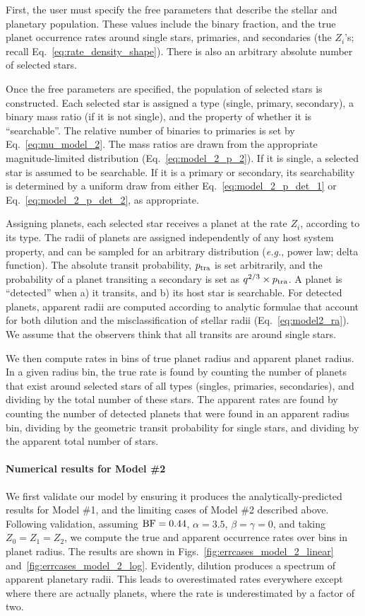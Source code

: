 First, the user must specify the free parameters that describe the 
stellar and planetary population. These values include the binary fraction, 
and the true planet occurrence rates around single stars, primaries, and 
secondaries (the $Z_i$'s; recall Eq.~\ref{eq:rate_density_shape}).
There is also an arbitrary absolute number of selected stars.

Once the free parameters are specified, the population of selected stars is 
constructed.
Each selected star is assigned a type (single, primary, secondary), a 
binary mass ratio (if it is not single), and the property of whether it is 
``searchable''.
The relative number of binaries to primaries is set by 
Eq.~\ref{eq:mu_model_2}.
The mass ratios are drawn from the appropriate magnitude-limited distribution 
(Eq.~\ref{eq:model_2_p_2}).
If it is single, a selected star is assumed to be searchable.
If it is a primary or secondary, its searchability is determined by a uniform 
draw from either Eq.~\ref{eq:model_2_p_det_1} or Eq.~\ref{eq:model_2_p_det_2}, 
as appropriate. 

Assigning planets, each selected star receives a planet at the rate $Z_i$, 
according to its type.
The radii of planets are assigned independently of any host system property, 
and can be sampled for an arbitrary distribution ({\it e.g.}, power law; delta 
function).
The absolute transit probability, $p_{\rm tra}$ is set arbitrarily, and the 
probability of a planet transiting a secondary is set as $q^{2/3}\times p_{\rm 
tra}$.
A planet is ``detected'' when a) it transits, and b) its host star is 
searchable.
For detected planets, apparent radii are computed according to analytic 
formulae that account for both dilution and the misclassification of stellar 
radii (Eq.~\ref{eq:model2_ra}).
We assume that the observers think that all transits are around single stars.

We then compute rates in bins of true planet radius and apparent planet radius.
In a given radius bin, the true rate is found by counting the number of planets
that exist around selected stars of all types (singles, primaries,
secondaries), and dividing by the total number of these stars.
The apparent rates are found by counting the number of detected planets that
were found in an apparent radius bin, dividing by the geometric transit
probability for single stars, and dividing by the apparent total number of
stars.


\paragraph{Numerical results for Model \#2}
We first validate our model by ensuring it produces the analytically-predicted 
results for Model \#1, and the limiting cases of Model \#2 described above.
Following validation, assuming ${\rm BF}=0.44$, $\alpha=3.5$, 
$\beta=\gamma=0$, and taking $Z_0=Z_1=Z_2$, we compute the true and apparent 
occurrence rates over bins in planet radius.
The results are shown in Figs.~\ref{fig:errcases_model_2_linear} 
and~\ref{fig:errcases_model_2_log}.
Evidently, dilution produces a spectrum of apparent planetary radii. This 
leads to overestimated rates everywhere except where there 
are actually planets, where the rate is underestimated by a factor of two.